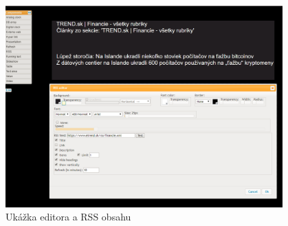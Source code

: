 \documentclass[11pt, oneside]{report}
\begin{document}
\begin{figure}[H]
    \centering
    \includegraphics[width=0.95\textwidth]{RSS}
    \caption{Ukážka editora a RSS obsahu}
    \label{fig:rsseditor}
\end{figure}
\end{document}
